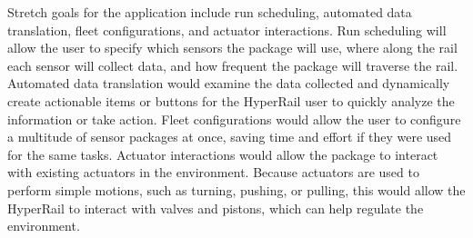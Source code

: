 \documentclass[onecolumn, draftclsnofoot,10pt, compsoc]{IEEEtran}
\begin{document}
Stretch goals for the application include run scheduling, automated data translation, fleet configurations, and actuator interactions. Run scheduling will allow the user to specify which sensors the package will use, where along the rail each sensor will collect data, and how frequent the package will traverse the rail. Automated data translation would examine the data collected and dynamically create actionable items or buttons for the HyperRail user to quickly analyze the information or take action. Fleet configurations would allow the user to configure a multitude of sensor packages at once, saving time and effort if they were used for the same tasks. Actuator interactions would allow the package to interact with existing actuators in the environment. Because actuators are used to perform simple motions, such as turning, pushing, or pulling, this would allow the HyperRail to interact with valves and pistons, which can help regulate the environment.


\end{document}

